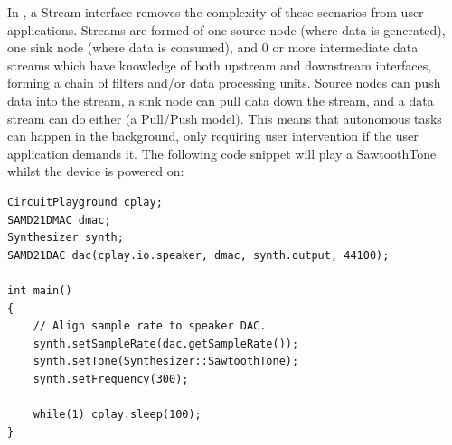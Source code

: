 In \CO, a Stream interface removes the complexity of these scenarios from user applications. Streams are formed of one source node (where data is generated), one sink node (where data is consumed), and 0 or more intermediate data streams which have knowledge of both upstream and downstream interfaces, forming a chain of filters and/or data processing units. Source nodes can push data into the stream, a sink node can pull data down the stream, and a data stream can do either (a Pull/Push model). This means that autonomous tasks can happen in the background, only requiring user intervention if the user application demands it.
The following code snippet will play a SawtoothTone whilst the device is powered on:
\begin{lstlisting}
CircuitPlayground cplay;
SAMD21DMAC dmac;
Synthesizer synth;
SAMD21DAC dac(cplay.io.speaker, dmac, synth.output, 44100);

int main()
{
    // Align sample rate to speaker DAC.
    synth.setSampleRate(dac.getSampleRate());
    synth.setTone(Synthesizer::SawtoothTone);
    synth.setFrequency(300);

    while(1) cplay.sleep(100);
}
\end{lstlisting}